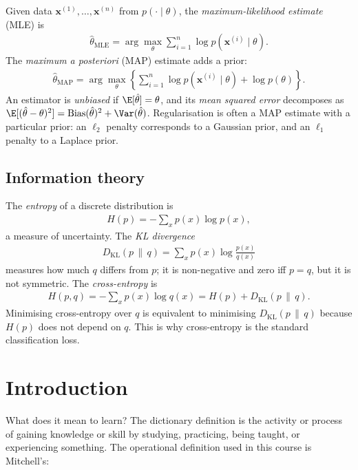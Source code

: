 \documentclass[a4paper, 12pt]{book}
\begin{document}
Given data $\mathbf{x}^{(1)},\ldots,\mathbf{x}^{(n)}$ from $p(\cdot\mid\theta)$, the
\emph{maximum-likelihood estimate} (MLE) is
\begin{align}
    \hat{\theta}_{\mathrm{MLE}}
    = \arg\max_{\theta} \sum_{i=1}^n \log p(\mathbf{x}^{(i)}\mid\theta).
\end{align}
The \emph{maximum a posteriori} (MAP) estimate adds a prior:
\begin{align}
    \hat{\theta}_{\mathrm{MAP}}
    = \arg\max_{\theta} \left\{
    \sum_{i=1}^n \log p(\mathbf{x}^{(i)}\mid\theta) + \log p(\theta)
    \right\}.
\end{align}
An estimator is \emph{unbiased} if $\E[\hat{\theta}] = \theta$, and its
\emph{mean squared error} decomposes as
$\E[(\hat{\theta}-\theta)^2] = \mathrm{Bias}(\hat{\theta})^2 +
\Var(\hat{\theta})$. Regularisation is often a MAP estimate with a particular prior:
an $\ell_2$ penalty corresponds to a Gaussian prior, and an $\ell_1$ penalty to a
Laplace prior.

\section{Information theory}

The \emph{entropy} of a discrete distribution is
\begin{align}
    H(p) = -\sum_x p(x)\log p(x),
\end{align}
a measure of uncertainty. The \emph{KL divergence}
\begin{align}
    D_{\mathrm{KL}}(p\,\|\,q) = \sum_x p(x)\log\frac{p(x)}{q(x)}
\end{align}
measures how much $q$ differs from $p$; it is non-negative and zero iff $p=q$, but it
is not symmetric. The \emph{cross-entropy} is
\begin{align}
    H(p,q) = -\sum_x p(x)\log q(x) = H(p) + D_{\mathrm{KL}}(p\,\|\,q).
\end{align}
Minimising cross-entropy over $q$ is equivalent to minimising
$D_{\mathrm{KL}}(p\,\|\,q)$ because $H(p)$ does not depend on $q$. This is why
cross-entropy is the standard classification loss.

\chapter{Introduction}
\label{ch:intro}






What does it mean to learn? The dictionary definition is the activity or process of
gaining knowledge or skill by studying, practicing, being taught, or experiencing
something. The operational definition used in this course is Mitchell's:
\end{document}
